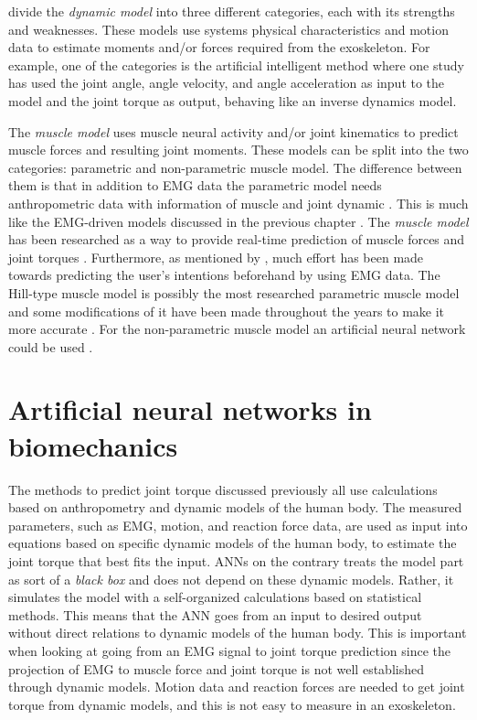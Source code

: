 \documentclass[../main.tex]{subfiles}
\begin{document}
\textcite{Anam2012} divide the \textit{dynamic model} into three different categories, each with its strengths and weaknesses.
These models use systems physical characteristics and motion data to estimate moments and/or forces required from the exoskeleton. 
For example, one of the categories is the artificial intelligent method where one study has used the joint angle, angle velocity, and angle acceleration as input to the model and the joint torque as output, behaving like an inverse dynamics model.

The \textit{muscle model} uses muscle neural activity and/or joint kinematics to predict muscle forces and resulting joint moments. 
These models can be split into the two categories: parametric and non-parametric muscle model. 
The difference between them is that in addition to \ac{EMG} data the parametric model needs anthropometric data with information of muscle and joint dynamic \cite{Anam2012}.
This is much like the \ac{EMG}-driven models discussed in the previous chapter \cite{Pizzolato2015}.
The \textit{muscle model} has been researched as a way to provide real-time prediction of muscle forces and joint torques \cite{Pizzolato2015, Anam2012, durandau}. 
Furthermore, as mentioned by \textcite{Anam2012}, much effort has been made towards predicting the user's intentions beforehand by using \ac{EMG} data.
The Hill-type muscle model is possibly the most researched parametric muscle model and some modifications of it have been made throughout the years to make it more accurate \cite{Pizzolato2015, Lloyd2003, Anam2012, Lee14-1}.
For the non-parametric muscle model an artificial neural network could be used \cite{Lee14-1, Kiguchi2012}.  

\section{Artificial neural networks in biomechanics}
The methods to predict joint torque discussed previously all use calculations based on anthropometry and dynamic models of the human body. 
The measured parameters, such as \ac{EMG}, motion, and reaction force data, are used as input into equations based on specific dynamic models of the human body, to estimate the joint torque that best fits the input.
\acp{ANN} on the contrary treats the model part as sort of a \textit{black box} and does not depend on these dynamic models. 
Rather, it simulates the model with a self-organized calculations based on statistical methods.
This means that the \ac{ANN} goes from an input to desired output without direct relations to dynamic models of the human body.
This is important when looking at going from an \ac{EMG} signal to joint torque prediction since the projection of \ac{EMG} to muscle force and joint torque is not well established through dynamic models.
Motion data and reaction forces are needed to get joint torque from dynamic models, and this is not easy to measure in an exoskeleton.
\end{document}
